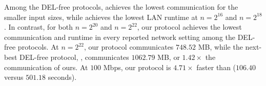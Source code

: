 Among the DEL-free protocols, \cite{TBZ+25} achieves the lowest communication for the smaller input sizes, while \cite{JSZG24} achieves the lowest LAN runtime at \(n=2^{16}\) and \(n=2^{18}\). In contrast, for both \(n=2^{20}\) and \(n=2^{22}\), our protocol achieves the lowest communication and runtime in every reported network setting among the DEL-free protocols. At \(n=2^{22}\), our protocol communicates \(748.52\) MB, while the next-best DEL-free protocol, \cite{TBZ+25}, communicates \(1062.79\) MB, or \(1.42\times\) the communication of ours. At \(100\) Mbps, our protocol is \(4.71\times\) faster than \cite{TBZ+25} (\(106.40\) versus \(501.18\) seconds).


